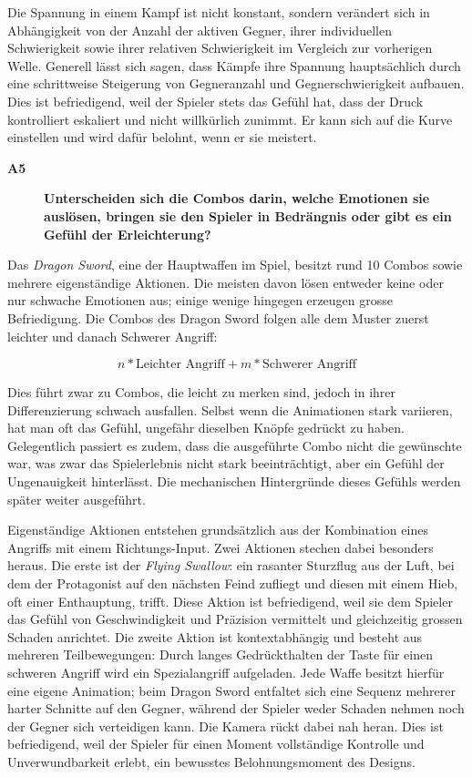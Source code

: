 \documentclass[../Main.tex]{subfiles}
\begin{document}
Die Spannung in einem Kampf ist nicht konstant, sondern verändert sich in Abhängigkeit von der Anzahl der aktiven Gegner, ihrer individuellen Schwierigkeit sowie ihrer relativen Schwierigkeit im Vergleich zur vorherigen Welle. Generell lässt sich sagen, dass Kämpfe ihre Spannung hauptsächlich durch eine schrittweise Steigerung von Gegneranzahl und Gegnerschwierigkeit aufbauen. Dies ist befriedigend, weil der Spieler stets das Gefühl hat, dass der Druck kontrolliert eskaliert und nicht willkürlich zunimmt. Er kann sich auf die Kurve einstellen und wird dafür belohnt, wenn er sie meistert.

\begin{description}
  \item[\textbf{A5}] \textbf{Unterscheiden sich die Combos darin, welche Emotionen sie auslösen, bringen sie den Spieler in Bedrängnis oder gibt es ein Gefühl der Erleichterung?}
\end{description}

Das \textit{Dragon Sword}, eine der Hauptwaffen im Spiel, besitzt rund 10 Combos sowie mehrere eigenständige Aktionen. Die meisten davon lösen entweder keine oder nur schwache Emotionen aus; einige wenige hingegen erzeugen grosse Befriedigung. Die Combos des Dragon Sword folgen alle dem Muster zuerst leichter und danach Schwerer Angriff:

\begin{equation*}
n * \text{Leichter Angriff} + m * \text{Schwerer Angriff}
\end{equation*}

Dies führt zwar zu Combos, die leicht zu merken sind, jedoch in ihrer Differenzierung schwach ausfallen. Selbst wenn die Animationen stark variieren, hat man oft das Gefühl, ungefähr dieselben Knöpfe gedrückt zu haben. Gelegentlich passiert es zudem, dass die ausgeführte Combo nicht die gewünschte war, was zwar das Spielerlebnis nicht stark beeinträchtigt, aber ein Gefühl der Ungenauigkeit hinterlässt. Die mechanischen Hintergründe dieses Gefühls werden später weiter ausgeführt.

Eigenständige Aktionen entstehen grundsätzlich aus der Kombination eines Angriffs mit einem Richtungs-Input. Zwei Aktionen stechen dabei besonders heraus. Die erste ist der \textit{Flying Swallow}: ein rasanter Sturzflug aus der Luft, bei dem der Protagonist auf den nächsten Feind zufliegt und diesen mit einem Hieb, oft einer Enthauptung, trifft. Diese Aktion ist befriedigend, weil sie dem Spieler das Gefühl von Geschwindigkeit und Präzision vermittelt und gleichzeitig grossen Schaden anrichtet. Die zweite Aktion ist kontextabhängig und besteht aus mehreren Teilbewegungen: Durch langes Gedrückthalten der Taste für einen schweren Angriff wird ein Spezialangriff aufgeladen. Jede Waffe besitzt hierfür eine eigene Animation; beim Dragon Sword entfaltet sich eine Sequenz mehrerer harter Schnitte auf den Gegner, während der Spieler weder Schaden nehmen noch der Gegner sich verteidigen kann. Die Kamera rückt dabei nah heran. Dies ist befriedigend, weil der Spieler für einen Moment vollständige Kontrolle und Unverwundbarkeit erlebt, ein bewusstes Belohnungsmoment des Designs.
\end{document}
